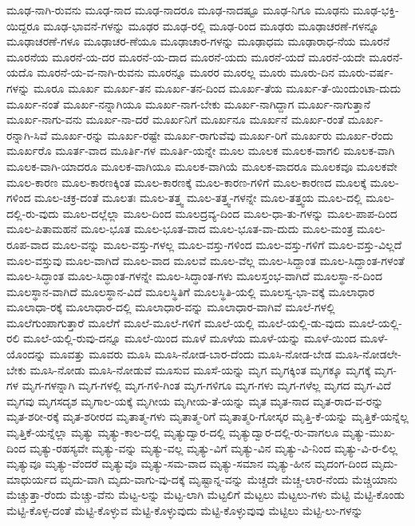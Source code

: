 {ಮೂಢ-ನಾಗಿ-ರುವನು
ಮೂಢ-ನಾದ
ಮೂಢ-ನಾದರೂ
ಮೂಢ-ನಾದಷ್ಟೂ
ಮೂಢ-ನಿಗೂ
ಮೂಢನು
ಮೂಢ-ಭಕ್ತಿ-ಯಿದ್ದರೂ
ಮೂಢ-ಭಾವನೆ-ಗಳನ್ನು
ಮೂಢರ
ಮೂಢ-ರಲ್ಲಿ
ಮೂಢ-ರಿಂದ
ಮೂಢರು
ಮೂಢಾಚರಣೆ-ಗಳನ್ನೂ
ಮೂಢಾಚರಣೆ-ಗಳೂ
ಮೂಢಾಚರ-ಣೆಯೂ
ಮೂಢಾಚಾರ-ಗಳನ್ನು
ಮೂಢಾಧಮ
ಮೂಢಾರಾಧ-ನೆಯ
ಮೂರನೆ
ಮೂರನೆಯ
ಮೂರನೆ-ಯ-ದರ
ಮೂರನೆ-ಯ-ದಾದ
ಮೂರನೆ-ಯದು
ಮೂರನೆ-ಯದೆ
ಮೂರನೆ-ಯದೇ
ಮೂರನೆ-ಯದೊ
ಮೂರನೆ-ಯ-ವ-ನಾಗಿ-ರುವನು
ಮೂರನ್ನೂ
ಮೂರರ
ಮೂರಲ್ಲ
ಮೂರು
ಮೂರು-ದಿನ
ಮೂರು-ವರ್ಷ-ಗಳನ್ನು
ಮೂರೂ
ಮೂರ್ಖ
ಮೂರ್ಖ-ತನ
ಮೂರ್ಖ-ತನ-ದಿಂದ
ಮೂರ್ಖ-ತೆಯ
ಮೂರ್ಖ-ತೆ-ಯಿಂದುಂಟಾ-ದುದು
ಮೂರ್ಖ-ನಂತೆ
ಮೂರ್ಖ-ನನ್ನಾಗಿಯೂ
ಮೂರ್ಖ-ನಾಗ-ಬೇಕು
ಮೂರ್ಖ-ನಾಗಿದ್ದಾಗ
ಮೂರ್ಖ-ನಾಗುತ್ತಾನೆ
ಮೂರ್ಖ-ನಾಗು-ವನು
ಮೂರ್ಖ-ನಾ-ದರೆ
ಮೂರ್ಖನಿಗೆ
ಮೂರ್ಖನೂ
ಮೂರ್ಖನೆ
ಮೂರ್ಖ-ರಂತೆ
ಮೂರ್ಖ-ರನ್ನಾಗಿ-ಸಿವೆ
ಮೂರ್ಖ-ರನ್ನು
ಮೂರ್ಖ-ರಷ್ಟೇ
ಮೂರ್ಖ-ರಾಗುವೆವು
ಮೂರ್ಖ-ರಿಗೆ
ಮೂರ್ಖರು
ಮೂರ್ಖ-ರೆಂದು
ಮೂರ್ಖರೊ
ಮೂರ್ತ-ವಾದ
ಮೂರ್ತಿ-ಗಳ
ಮೂರ್ತಿ-ಯನ್ನೇ
ಮೂಲ
ಮೂಲಕ
ಮೂಲಕ-ವಾಗಲಿ
ಮೂಲಕ-ವಾಗಿ
ಮೂಲಕ-ವಾಗಿ-ಯಾದರೂ
ಮೂಲಕ-ವಾಗಿಯೂ
ಮೂಲಕ-ವಾಗಿಯೆ
ಮೂಲಕ-ವಾದರೂ
ಮೂಲಕವೂ
ಮೂಲಕವೇ
ಮೂಲ-ಕಾರಣ
ಮೂಲ-ಕಾರಣಕ್ಕಿಂತ
ಮೂಲ-ಕಾರಣಕ್ಕೆ
ಮೂಲ-ಕಾರಣ-ಗಳಿಗೆ
ಮೂಲ-ಕಾರಣದ
ಮೂಲಕ್ಕೆ
ಮೂಲ-ಗಳಿಂದ
ಮೂಲ-ಚಕ್ರ-ದಂತೆ
ಮೂಲತಃ
ಮೂಲ-ತತ್ತ್ವ
ಮೂಲ-ತತ್ತ್ವ-ಗಳನ್ನೇ
ಮೂಲ-ತತ್ತ್ವಯ
ಮೂಲ-ದಲ್ಲಿ
ಮೂಲ-ದಲ್ಲಿ-ರು-ವುದು
ಮೂಲ-ದಲ್ಲೆಲ್ಲಾ
ಮೂಲ-ದಿಂದ
ಮೂಲದ್ರವ್ಯ-ದಿಂದ
ಮೂಲ-ಧಾ-ತು-ಗಳನ್ನು
ಮೂಲ-ಪಾಪ-ದಿಂದ
ಮೂಲ-ಪಿತಾಮಹನೆ
ಮೂಲ-ಭೂತ
ಮೂಲ-ಭೂತ-ವಾದ
ಮೂಲ-ಭೂತ-ವಾ-ದುದು
ಮೂಲ-ಮಂತ್ರ
ಮೂಲ-ರೂಪ-ವಾದ
ಮೂಲ-ವನ್ನು
ಮೂಲ-ವಸ್ತು-ಗಳಲ್ಲ
ಮೂಲ-ವಸ್ತು-ಗಳಿಂದ
ಮೂಲ-ವಸ್ತು-ಗಳಿಗೆ
ಮೂಲ-ವಸ್ತು-ವಿಲ್ಲದೆ
ಮೂಲ-ವಸ್ತುವು
ಮೂಲ-ವಾಗಿದೆ
ಮೂಲ-ವಾದ
ಮೂಲವೆ
ಮೂಲ-ವೆಲ್ಲ
ಮೂಲ-ಸಿದ್ದಾಂತ
ಮೂಲ-ಸಿದ್ದಾಂತ-ಗಳಂತೆ
ಮೂಲ-ಸಿದ್ಧಾಂತ
ಮೂಲ-ಸಿದ್ಧಾಂತ-ಗಳನ್ನೇ
ಮೂಲ-ಸಿದ್ಧಾಂತ-ಗಳು
ಮೂಲಸ್ತಂಭ-ವಾಗಿದೆ
ಮೂಲಸ್ಥಾ-ನ-ದಿಂದ
ಮೂಲಸ್ಥಾನ-ವಾಗಿದೆ
ಮೂಲಸ್ಥಾನ-ವಿದೆ
ಮೂಲಸ್ಥಿತಿಗೆ
ಮೂಲಸ್ಥಿತಿ-ಯಲ್ಲಿ
ಮೂಲಸ್ವ-ಭಾ-ವಕ್ಕೆ
ಮೂಲಾಧಾರ
ಮೂಲಾಧಾ-ರಕ್ಕೆ
ಮೂಲಾಧಾರ-ದಲ್ಲಿ
ಮೂಲಾಧಾರ-ವನ್ನು
ಮೂಲಾಧಾರ-ವಾಗಿವೆ
ಮೂಲೆ-ಗಳಲ್ಲಿ
ಮೂಲೆಗುಂಪಾಗುತ್ತಾರೆ
ಮೂಲೆಗೆ
ಮೂಲೆ-ಮೂಲೆ-ಗಳಿಗೆ
ಮೂಲೆ-ಯಲ್ಲಿ
ಮೂಲೆ-ಯಲ್ಲಿ-ಡು-ವುದು
ಮೂಲೆ-ಯಲ್ಲಿ-ರಲಿ
ಮೂಲೆ-ಯಲ್ಲಿ-ರುವು-ದನ್ನೂ
ಮೂಲೆ-ಯಿಂದ
ಮೂಳೆ
ಮೂಳೆಯ
ಮೂಳೆ-ಯನ್ನು
ಮೂಳೆ-ಯಿಂದ
ಮೂಳೆ-ಯೊಂದನ್ನು
ಮೂವತ್ತು
ಮೂವರು
ಮೂಸಿ
ಮೂಸಿ-ನೋಡ-ಬಾರ-ದೆಂದು
ಮೂಸಿ-ನೋಡ-ಬೇಡ
ಮೂಸಿ-ನೋಡಲೇ-ಬೇಕು
ಮೂಸಿ-ನೋಡು
ಮೂಸಿ-ನೋಡುವೆ
ಮೂಸುವ
ಮೂಸೆ-ಯನ್ನು
ಮೃಗ
ಮೃಗಕ್ಕಿಂತ
ಮೃಗಕ್ಕೂ
ಮೃಗಕ್ಕೆ
ಮೃಗ-ಗಳ
ಮೃಗ-ಗಳನ್ನಾಗಿ
ಮೃಗ-ಗಳಲ್ಲಿ
ಮೃಗ-ಗಳಿ-ಗಿಂತ
ಮೃಗ-ಗಳಿಗೂ
ಮೃಗ-ಗಳು
ಮೃಗ-ಗಳೆಲ್ಲ
ಮೃಗದ
ಮೃಗ-ವಿದೆ
ಮೃಗವು
ಮೃಗಸದೃಶ
ಮೃಗಾಲ-ಯಕ್ಕೆ
ಮೃಗೀಯ
ಮೃಗೀಯ-ತೆ-ಯನ್ನು
ಮೃತ
ಮೃತ-ನಾದ
ಮೃತ-ರಾದ-ವ-ರನ್ನು
ಮೃತ-ಶರೀ-ರಕ್ಕೆ
ಮೃತ-ಶರೀರದ
ಮೃತಾತ್ಮ-ಗಳು
ಮೃತಾತ್ಮ-ರಿಗೆ
ಮೃತಾತ್ಮರಿ-ಗೋಸ್ಕರ
ಮೃತ್ತಿ-ಕೆ-ಯನ್ನು
ಮೃತ್ತಿಕೆ-ಯನ್ನೆಲ್ಲ
ಮೃತ್ತಿಕೆ-ಯನ್ನೆಲ್ಲಾ
ಮೃತ್ಯು
ಮೃತ್ಯು-ಕಾಲ-ದಲ್ಲಿ
ಮೃತ್ಯುದ್ವಾರ-ದಲ್ಲಿ
ಮೃತ್ಯುದ್ವಾರ-ದಲ್ಲಿ-ರು-ವಾಗಲೂ
ಮೃತ್ಯು-ಮುಖ-ದಿಂದ
ಮೃತ್ಯು-ರಹಸ್ಯವೇ
ಮೃತ್ಯು-ವನ್ನು
ಮೃತ್ಯು-ವಲ್ಲ
ಮೃತ್ಯು-ವಿಗೆ
ಮೃತ್ಯು-ವಿನ
ಮೃತ್ಯು-ವಿ-ನಿಂದ
ಮೃತ್ಯು-ವಿ-ರ-ಲಿಲ್ಲ
ಮೃತ್ಯುವೂ
ಮೃತ್ಯು-ವೆಂದರೆ
ಮೃತ್ಯುವೊ
ಮೃತ್ಯು-ಸಮ-ವಾದ
ಮೃತ್ಯು-ಸಮಾನ
ಮೃತ್ಯು-ಹೀನ
ಮೃದಂಗ-ದಿಂದ
ಮೃದು-ಮಾಧುರ್ಯದ
ಮೃದು-ವಾಗಿ
ಮೃದು-ವಾಗು-ವು-ದಕ್ಕೆ
ಮೃಷ್ಟಾನ್ನ-ವನ್ನು
ಮೆಚ್ಚದೇ
ಮೆಚ್ಚ-ಲಾರ-ನೆಂದು
ಮೆಚ್ಚಿಯಾನು
ಮೆಚ್ಚುತ್ತಾ-ರೆಂದು
ಮೆಚ್ಚು-ವೆನು
ಮೆಟ್ಟ-ಲನ್ನು
ಮೆಟ್ಟ-ಲಾಗಿ
ಮೆಟ್ಟಲಿಗೆ
ಮೆಟ್ಟಲು
ಮೆಟ್ಟಲು-ಗಳು
ಮೆಟ್ಟಿ
ಮೆಟ್ಟಿ-ಕೊಂಡು
ಮೆಟ್ಟಿ-ಕೊಳ್ಳ-ದಂತೆ
ಮೆಟ್ಟಿ-ಕೊಳ್ಳುವ
ಮೆಟ್ಟಿ-ಕೊಳ್ಳುವುದು
ಮೆಟ್ಟಿ-ಕೊಳ್ಳುವುವು
ಮೆಟ್ಟಿಲು
ಮೆಟ್ಟಿ-ಲು-ಗಳನ್ನು
}
